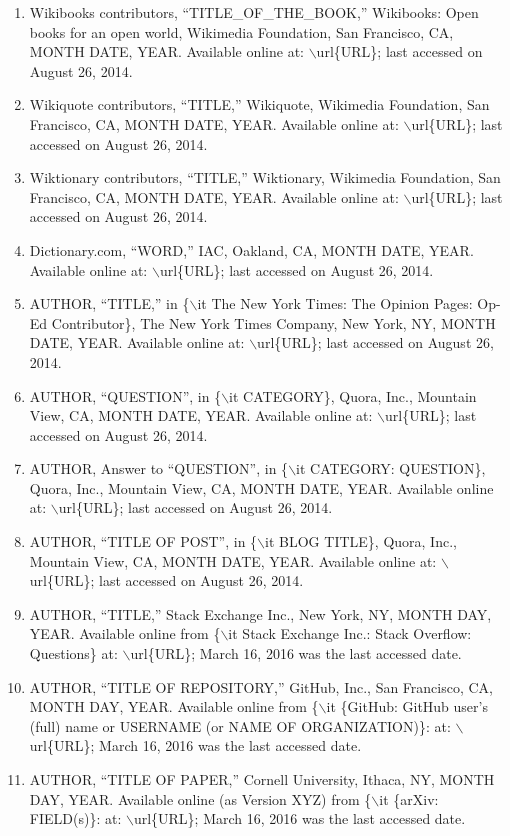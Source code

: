 \documentclass[letter,12pt]{article}
\begin{document}
\begin{enumerate}
\begin{enumerate}
	\item Wikibooks contributors, ``TITLE\_OF\_THE\_BOOK,'' Wikibooks: Open books for an open world, Wikimedia Foundation, San Francisco, CA, MONTH DATE, YEAR. Available online at: $\backslash$url\{URL\}; last accessed on August 26, 2014.
	\item Wikiquote contributors, ``TITLE,'' Wikiquote, Wikimedia Foundation, San Francisco, CA, MONTH DATE, YEAR. Available online at: $\backslash$url\{URL\}; last accessed on August 26, 2014.
	\item Wiktionary contributors, ``TITLE,'' Wiktionary, Wikimedia Foundation, San Francisco, CA, MONTH DATE, YEAR. Available online at: $\backslash$url\{URL\}; last accessed on August 26, 2014.
	\item Dictionary.com, ``WORD,'' IAC, Oakland, CA, MONTH DATE, YEAR. Available online at: $\backslash$url\{URL\}; last accessed on August 26, 2014.
	\item AUTHOR, ``TITLE,'' in \{$\backslash$it The New York Times: The Opinion Pages: Op-Ed Contributor\}, The New York Times Company, New York, NY, MONTH DATE, YEAR. Available online at: $\backslash$url\{URL\}; last accessed on August 26, 2014.
	\item AUTHOR, ``QUESTION'', in \{$\backslash$it CATEGORY\}, Quora, Inc., Mountain View, CA, MONTH DATE, YEAR. Available online at: $\backslash$url\{URL\}; last accessed on August 26, 2014.
	\item AUTHOR, Answer to ``QUESTION'', in \{$\backslash$it CATEGORY: QUESTION\}, Quora, Inc., Mountain View, CA, MONTH DATE, YEAR. Available online at: $\backslash$url\{URL\}; last accessed on August 26, 2014.
	\item AUTHOR, ``TITLE OF POST'', in \{$\backslash$it BLOG TITLE\}, Quora, Inc., Mountain View, CA, MONTH DATE, YEAR. Available online at: $\backslash$url\{URL\}; last accessed on August 26, 2014.
	\item AUTHOR, ``TITLE,'' Stack Exchange Inc., New York, NY, MONTH DAY, YEAR. Available online from \{$\backslash$it Stack Exchange Inc.: Stack Overflow: Questions\} at: $\backslash$url\{URL\}; March 16, 2016 was the last accessed date.
	\item AUTHOR, ``TITLE OF REPOSITORY,'' GitHub, Inc., San Francisco, CA, MONTH DAY, YEAR. Available online from \{$\backslash$it \{GitHub: GitHub user's (full) name or USERNAME (or NAME OF ORGANIZATION)\}: at: $\backslash$url\{URL\}; March 16, 2016 was the last accessed date.
	\item AUTHOR, ``TITLE OF PAPER,'' Cornell University, Ithaca, NY, MONTH DAY, YEAR. Available online (as Version XYZ) from \{$\backslash$it \{arXiv: FIELD(s)\}: at: $\backslash$url\{URL\}; March 16, 2016 was the last accessed date.

\end{enumerate}
\end{enumerate}
\end{document}
